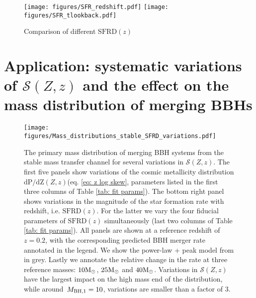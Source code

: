 \documentclass[twocolumn]{aastex631}
\newcommand{\Msun}{\ensuremath{\rm{M}_{\odot}}\xspace}
\newcommand{\Mbheen}{\ensuremath{\,M_{\rm BH, 1}}\xspace}
\newcommand{\SFRDzZ}{\ensuremath{\mathcal{S}(Z,z)}\xspace}
\newcommand{\SFRDz}{\ensuremath{\mathrm{SFRD}(z)}\xspace}
\newcommand{\dpdZ}{\ensuremath{\mathrm{dP/dZ}(Z,z)}\xspace}
\begin{document}


\begin{figure*}
\centering
{}
\texttt{[image: figures/SFR\_redshift.pdf]}
\texttt{[image: figures/SFR\_tlookback.pdf]}
\caption{Comparison of different \SFRDz
 \label{fig: SFR(z)}}
\end{figure*}



\section{Application: systematic variations of \SFRDzZ and the effect on the mass distribution of merging BBHs \label{sec: mass dists}}


\begin{figure*}
\centering
{}
\texttt{[image: figures/Mass\_distributions\_stable\_SFRD\_variations.pdf]}
\caption{The primary mass distribution of merging BBH systems from the stable mass transfer channel for several variations in \SFRDzZ. 
The first five panels show variations of the cosmic metallicity distribution  \dpdZ (eq. \ref{eq: z log skew}, parameters listed in the first three columns of Table \ref{tab: fit params}). The bottom right panel shows variations in the magnitude of the star formation rate with redshift, i.e. \SFRDz. For the latter we vary the four fiducial parameters of \SFRDz simultaneously (last two columns of Table \ref{tab: fit params}). All panels are shown at a reference redshift of $z=0.2$, with the corresponding predicted BBH merger rate annotated in the legend. We show the power-law + peak model from \protect\cite{GWTC3_popPaper2021} in grey. Lastly we annotate the relative change in the rate at three reference masses: $10\Msun$, $25\Msun$ and $40\Msun$. Variations in \SFRDzZ have the largest impact on the high mass end of the distribution, while around $\Mbheen=10$, variations are smaller than a factor of 3.  
  \label{fig: mass dists}}
\end{figure*}
\end{document}
